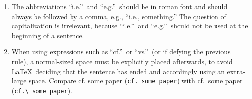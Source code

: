 \documentclass[letterpaper,11pt]{article}
\begin{document}
\begin{enumerate}

\item The abbreviations ``i.e.''\ and ``e.g.''\ should be in roman font and
should always be followed by a comma, e.g., ``i.e., something.''  The question of capitalization is irrelevant, because
``i.e.''\ and ``e.g.''\ should not be used at the beginning of a sentence.

\item When using expressions such as ``cf.''\ or ``vs.''\ (or if defying the previous rule), a normal-sized space must be explicitly placed afterwards, to avoid La\TeX\ deciding that the sentence has ended and accordingly using an extra-large space. Compare cf. some paper (\verb|cf. some paper|) with cf.\ some paper (\verb|cf.\ some paper|).





\end{enumerate}
\end{document}
